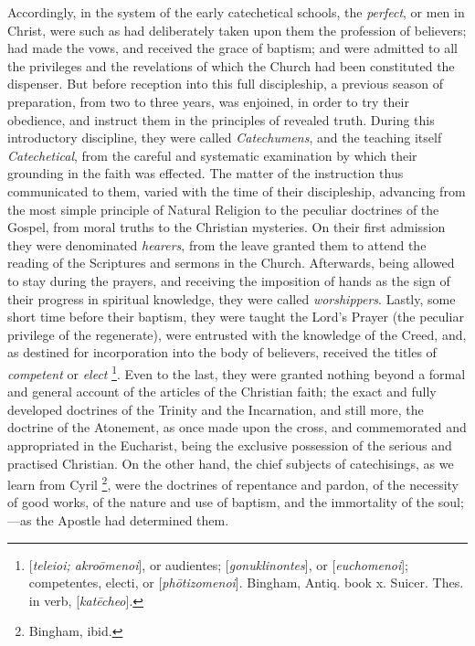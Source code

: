 Accordingly, in the system of the early catechetical schools, the \emph{perfect},
or men in Christ, were such as had deliberately taken upon them the
profession of believers; had made the vows, and received the grace of
baptism; and were admitted to all the privileges and the revelations
of which the Church had been constituted the dispenser. But before
reception into this full discipleship, a previous season of
preparation, from two to three years, was enjoined, in order to try
their obedience, and instruct them in the principles of revealed
truth. During this introductory discipline, they were called \emph{Catechumens},
and the teaching itself \emph{Catechetical}, from the careful and
systematic examination by which their grounding in the faith was
effected. The matter of the instruction thus communicated to them,
varied with the time of their discipleship, advancing from the most
simple principle of Natural Religion to the peculiar doctrines of the
Gospel, from moral truths to the Christian mysteries. On their first
admission they were denominated \emph{hearers}, from the leave
granted them to attend the reading of the Scriptures and sermons in
the Church. Afterwards, being allowed to stay during the prayers, and
receiving the imposition of hands as the sign of their progress in
spiritual knowledge, they were called \emph{worshippers}. Lastly, some
short time before their baptism, they were taught the Lord's Prayer
(the peculiar privilege of the regenerate), were entrusted with the
knowledge of the Creed, and, as destined for incorporation into the
body of believers, received the titles of \emph{competent} or \emph{elect}
\footnote{[\emph{teleioi; akro\={o}menoi}], or
audientes; [\emph{gonuklinontes}], or [\emph{euchomenoi}]; competentes,
electi, or [\emph{ph\={o}tizomenoi}]. Bingham, Antiq. book x.
Suicer. Thes. in verb, [\emph{kat\={e}che}\emph{o}].}. Even to the last, they
were granted nothing beyond a formal and general account of the
articles of the Christian faith; the exact and fully developed
doctrines of the Trinity and the Incarnation, and still more, the
doctrine of the Atonement, as once made upon the cross, and
commemorated and appropriated in the Eucharist, being the exclusive
possession of the serious and practised Christian. On the other hand,
the chief subjects of catechisings, as we learn from Cyril \footnote{Bingham, ibid.}, were the doctrines of repentance and pardon, of the necessity
of good works, of the nature and use of baptism, and the immortality
of the soul;—as the Apostle had determined them.

